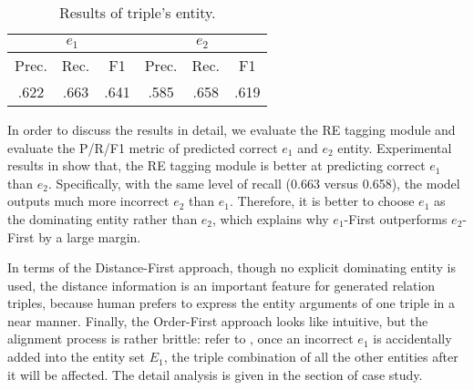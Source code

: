 \begin{table}[h!]
  \small
  \caption{Results of triple's entity.}
  \label{tab:entity}
  \begin{center}
    \begin{tabular}{ccc|ccc}
      \hline
      \multicolumn{3}{c}{\bf $e_1$} & \multicolumn{3}{|c}{\bf $e_2$} \\
      \hline
       Prec. & Rec. & F1 & Prec. & Rec. & F1 \\
      \hline
      .622 & .663 & .641 & .585 & .658 & .619 \\
      \hline
    \end{tabular}
  \end{center}
\end{table}

In order to discuss the results in detail, we evaluate the RE tagging module
and evaluate the P/R/F1 metric of predicted correct $e_1$ and $e_2$ entity.
Experimental results in  show that,
the RE tagging module is better at predicting correct $e_1$ than $e_2$.
Specifically, with the same level of recall (0.663 versus 0.658),
the model outputs much more incorrect $e_2$ than $e_1$.
Therefore, it is better to choose $e_1$ as the dominating entity rather than $e_2$,
which explains why $e_1$-First outperforms $e_2$-First by a large margin.

In terms of the Distance-First approach, though no explicit dominating entity is used,
the distance information is an important feature for generated relation triples,
because human prefers to express the entity arguments of one triple in a near manner.
Finally, the Order-First approach looks like intuitive,
but the alignment process is rather brittle: refer to ,
once an incorrect $e_1$ is accidentally added into the entity set $E_1$,
the triple combination of all the other entities after it will be affected.
The detail analysis is given in the section of case study.




